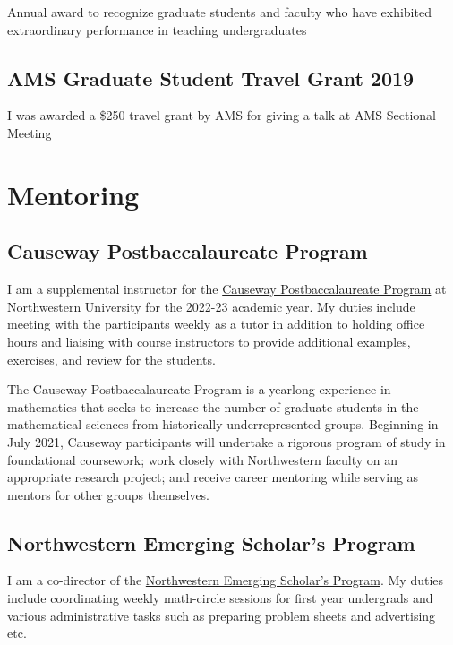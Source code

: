 \documentclass[
]{report}
\begin{document}
Annual award to recognize graduate students and faculty who have exhibited extraordinary performance in teaching undergraduates

\hypertarget{ams-graduate-student-travel-grant-2019}{%
\section{AMS Graduate Student Travel Grant 2019}\label{ams-graduate-student-travel-grant-2019}}

I was awarded a \$250 travel grant by AMS for giving a talk at AMS Sectional Meeting

\hypertarget{mentoring}{%
\chapter{Mentoring}\label{mentoring}}

\hypertarget{causeway-postbaccalaureate-program}{%
\section{Causeway Postbaccalaureate Program}\label{causeway-postbaccalaureate-program}}

I am a supplemental instructor for the \href{https://sites.northwestern.edu/causeway/}{Causeway Postbaccalaureate Program}
at Northwestern University for the 2022-23 academic year.
My duties include meeting with the participants weekly as a tutor in addition to holding office hours and liaising with course instructors to provide additional examples, exercises, and review for the students.

The Causeway Postbaccalaureate Program is a yearlong experience in mathematics that seeks to increase the number of graduate students in the mathematical sciences from historically underrepresented groups. Beginning in July 2021, Causeway participants will undertake a rigorous program of study in foundational coursework; work closely with Northwestern faculty on an appropriate research project; and receive career mentoring while serving as mentors for other groups themselves.

\hypertarget{northwestern-emerging-scholars-program}{%
\section{Northwestern Emerging Scholar's Program}\label{northwestern-emerging-scholars-program}}

I am a co-director of the \href{https://www.math.northwestern.edu/undergraduate/prizes-competitions-organizations/northwestern-emerging-scholars.html}{Northwestern Emerging Scholar's
Program}.
My duties include coordinating weekly math-circle sessions for first year undergrads and various administrative tasks such as preparing problem sheets and advertising etc.
\end{document}
